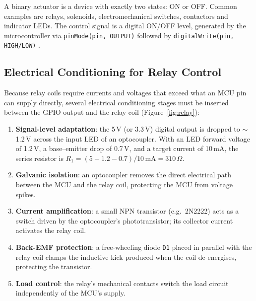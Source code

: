 \documentclass[12pt]{article}
\begin{document}
A binary actuator is a device with exactly two states: ON or OFF. Common examples are relays, solenoids, electromechanical switches, contactors and indicator LEDs. The control signal is a digital ON/OFF level, generated by the microcontroller via \texttt{pinMode(pin, OUTPUT)} followed by \texttt{digitalWrite(pin, HIGH/LOW)} \cite{labbrief}.

\subsection{Electrical Conditioning for Relay Control}

Because relay coils require currents and voltages that exceed what an MCU pin can supply directly, several electrical conditioning stages must be inserted between the GPIO output and the relay coil (Figure~\ref{fig:relay}):
\begin{enumerate}
  \item \textbf{Signal-level adaptation}: the 5\,V (or 3.3\,V) digital output is dropped to $\sim$1.2\,V across the input LED of an optocoupler. With an LED forward voltage of 1.2\,V, a base--emitter drop of 0.7\,V, and a target current of 10\,mA, the series resistor is $R_1 = (5 - 1.2 - 0.7)/10\,\text{mA} = 310\,\Omega$.
  \item \textbf{Galvanic isolation}: an optocoupler removes the direct electrical path between the MCU and the relay coil, protecting the MCU from voltage spikes.
  \item \textbf{Current amplification}: a small NPN transistor (e.g.\ 2N2222) acts as a switch driven by the optocoupler's phototransistor; its collector current activates the relay coil.
  \item \textbf{Back-EMF protection}: a free-wheeling diode \texttt{D1} placed in parallel with the relay coil clamps the inductive kick produced when the coil de-energises, protecting the transistor.
  \item \textbf{Load control}: the relay's mechanical contacts switch the load circuit independently of the MCU's supply.
\end{enumerate}
\end{document}
